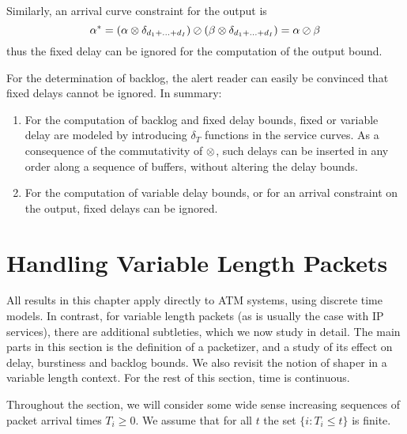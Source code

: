 Similarly, an arrival curve constraint for the output is
$$\alpha^*=\left(\alpha \otimes \delta_{d_1+...+d_I}\right) \oslash \left(\beta \otimes
\delta_{d_1+...+d_I} \right) = \alpha \oslash \beta
$$
thus the fixed delay can be ignored for the computation of the
output bound.

For the determination of backlog, the alert reader can easily be
convinced that fixed delays cannot be ignored. In summary:

\begin{proposition}
\begin{enumerate}
  \item For the computation of
backlog and fixed delay bounds, fixed or variable delay are
modeled by introducing $\delta_{T}$ functions in the service
curves. As a consequence of the commutativity of $\otimes$, such
delays can be inserted in any order along a sequence of buffers,
without altering the delay bounds.
  \item For the computation of variable delay bounds, or for an
  arrival constraint on the output, fixed delays can be ignored.
\end{enumerate}
\end{proposition}

\section{Handling Variable Length Packets}
\label{sec-vlp}

All results in this chapter apply directly to ATM systems, using
discrete time models. In contrast, for variable length packets (as
is usually the case with IP services), there are additional
subtleties, which we now study in detail. The main parts in this
section is the definition of a packetizer, and a study of its
effect on delay, burstiness and backlog bounds. We also revisit
the notion of shaper in a variable length context. For the rest of
this section, time is continuous.

Throughout the section, we will consider some wide sense
increasing sequences of packet arrival times $T_i \geq 0$. We
assume that for all $t$ the set $\{i: T_i\leq t\}$ is finite.

